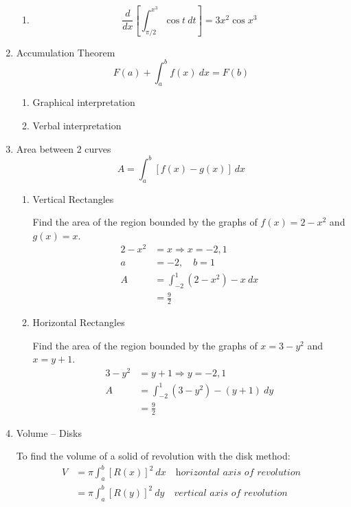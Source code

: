 \documentclass[fleqn]{article}
\begin{document}
\begin{enumerate}
\begin {enumerate}
\item 
\begin{equation*}
\frac{d}{dx}\left[\int_{\pi / 2}^{x^3} \cos{t} \ dt\right] = 3x^2 \cos x^3
\end{equation*}

\end{enumerate}

\item Accumulation Theorem
\begin{equation*}
 F(a) + \int_a^b f(x) \ dx = F(b)
 \end{equation*}
\begin {enumerate}

\item Graphical interpretation

\item Verbal interpretation

\end{enumerate}

\item Area between 2 curves
\begin{equation*}
A = \int_a^b [f(x) - g(x)] \ dx
\end{equation*}
\begin {enumerate}
\item Vertical Rectangles

Find the area of the region bounded by the graphs of $f(x) = 2 - x^2$ and $g(x) = x$.
\begin{align*}
2-x^2 & = x \Rightarrow x = -2,1\\
a & = -2, \quad b = 1\\
A &= \int _{-2}^1 (2-x^2)-x \ dx\\
&= \frac{9}{2}
\end{align*}

\item Horizontal Rectangles

Find the area of the region bounded by the graphs of $x=3-y^2$ and $x=y+1$.
\begin{align*}
3-y^2 &= y+1 \Rightarrow y = -2,1\\
A &= \int _{-2}^1 (3-y^2) - (y+ 1) \ dy\\
&= \frac{9}{2}
\end{align*}

\end{enumerate}
\item Volume -- Disks

To find the volume of a solid of revolution with the disk method:
\begin{align*}
V &= \pi \int_a^b \left [ R(x)\right]^2 \ dx \quad \textit{horizontal axis of revolution}\\
&= \pi \int_a^b \left [ R(y)\right]^2 \ dy \quad \textit{vertical axis of revolution}\\
\end{align*}
\begin {enumerate}


\end{enumerate}
\end{enumerate}
\end{document}
